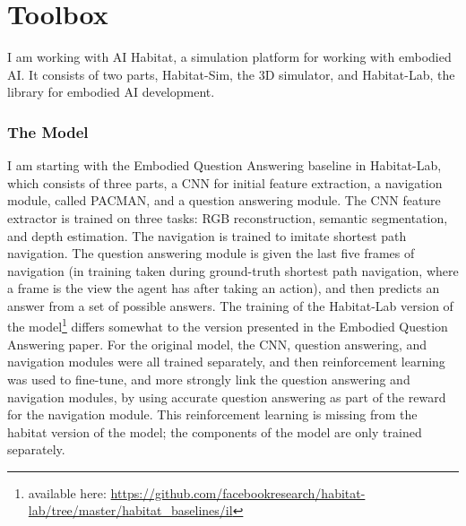 \chapter{Toolbox}
I am working with AI Habitat, a simulation platform for working with embodied AI\cite{habitat19iccv}. It consists of two parts, Habitat-Sim, the 3D simulator, and Habitat-Lab, the library for embodied AI development. 

\subsection{The Model}
\label{subsection:model}
I am starting with the Embodied Question Answering baseline in Habitat-Lab, which consists of three parts, a CNN for initial feature extraction, a navigation module, called PACMAN, and a question answering module\cite{embodiedqa}.
The CNN feature extractor is trained on three tasks: RGB reconstruction, semantic segmentation, and depth estimation.
The navigation is trained to imitate shortest path navigation. %
The question answering module is given the last five frames of navigation (in training taken during ground-truth shortest path navigation, where a frame is the view the agent has after taking an action), and then predicts an answer from a set of possible answers. 
The training of the Habitat-Lab version of the model\footnote{available here: \url{https://github.com/facebookresearch/habitat-lab/tree/master/habitat_baselines/il}} differs somewhat to the version presented in the Embodied Question Answering paper\cite{embodiedqa}. For the original model, the CNN, question answering, and navigation modules were all trained separately, and then reinforcement learning was used to fine-tune, and more strongly link the question answering and navigation modules, by using accurate question answering %
as part of the reward for the navigation module. This reinforcement learning is missing from the habitat version of the model; the components of the model are only trained separately. 


